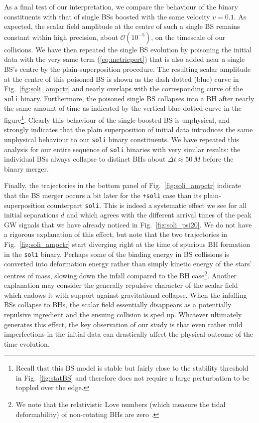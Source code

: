 \documentclass[]{iopart}
\begin{document}
As a final test of our interpretation, we compare the behaviour of
the binary constituents with that of single BSs boosted with the
same velocity $v=0.1$. As expected, the scalar field amplitude at
the centre of such a single BS remains constant within high precision,
about $\mathcal{O}(10^{-5})$, on the timescale of our collisions.
We have then repeated the single BS evolution by poisoning the
initial data with the very same term (\ref{eq:metricpert}) that is
also added near a single BS's centre by the plain-superposition
procedure.  The resulting scalar amplitude at the centre of this
poisoned BS is shown as the dash-dotted (blue) curve in
Fig.~\ref{fig:soli_ampctr} and nearly overlaps with the corresponding
curve of the {\tt soli} binary. Furthermore, the poisoned single
BS collapses into a BH after nearly the same amount of time as
indicated \setcounter{footnote}{4} by the vertical blue dotted curve
in the figure\footnote{ Recall that this BS model is stable but
fairly close to the stability threshold in Fig.~\ref{fig:statBS}
and therefore does not require a large perturbation to be toppled
over the edge.}.  Clearly this behaviour of the single boosted BS
is unphysical, and strongly indicates that the plain superposition
of initial data introduces the same unphysical behaviour to our
{\tt soli} binary constituents.  We have repeated this analysis for
our entire sequence of {\tt soli} binaries with very similar results:
the individual BSs always collapse to distinct BHs about $\Delta
t\approx 50\,M$ before the binary merger.

Finally, the trajectories in the bottom panel of Fig.~\ref{fig:soli_ampctr}
indicate that the BS merger occurs a bit later for the {\tt +soli}
case than its plain-superposition counterpart {\tt soli}. This is
indeed a systematic effect we see for all initial separations $d$
and which agrees with the different arrival times of the peak GW
signals that we have already noticed in Fig.~\ref{fig:soli_psi20}.
We do not have a rigorous explanation of this effect, but note that
the two trajectories in Fig.~\ref{fig:soli_ampctr} start diverging
right at the time of spurious BH formation in the {\tt soli} binary.
Perhaps some of the binding energy in BS collisions is converted
into deformation energy rather than simply kinetic energy of the
stars' centres of mass, slowing down the infall compared to the BH
case\footnote{We note that the relativistic Love numbers (which
measure the tidal deformability) of non-rotating BHs are zero
\cite{Binnington:2009bb}.}.  Another explanation may consider the
generally repulsive character of the scalar field which endows it
with support against gravitational collapse. When the infalling BSs
collapse to BHs, the scalar field essentially disappears as a
potentially repulsive ingredient and the ensuing collision is sped
up. Whatever ultimately generates this effect, the key observation
of our study is that even rather mild imperfections in the initial
data can drastically affect the physical outcome of the time
evolution.
\end{document}
